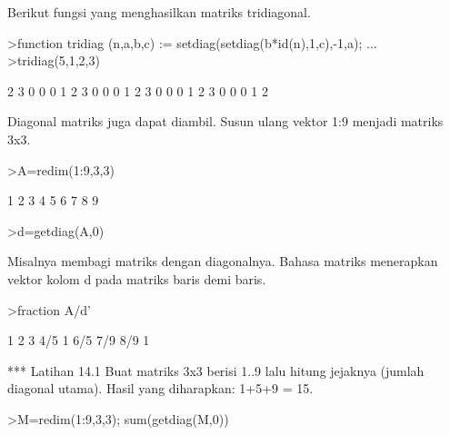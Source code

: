 \documentclass[a4paper,10pt]{article}
\begin{document}
\begin{eulernotebook}
\begin{eulercomment}
\begin{eulercomment}
\begin{eulercomment}
\begin{eulercomment}
\begin{eulercomment}
\begin{eulercomment}
\begin{eulercomment}
\begin{eulercomment}
\begin{eulercomment}
\begin{eulercomment}
\begin{eulercomment}
\begin{eulercomment}
\begin{eulercomment}
\begin{eulercomment}
\begin{eulercomment}
Berikut fungsi yang menghasilkan matriks tridiagonal.
\end{eulercomment}
\begin{eulerprompt}
>function tridiag (n,a,b,c) := setdiag(setdiag(b*id(n),1,c),-1,a); ...
>tridiag(5,1,2,3)
\end{eulerprompt}
\begin{euleroutput}
              2             3             0             0             0 
              1             2             3             0             0 
              0             1             2             3             0 
              0             0             1             2             3 
              0             0             0             1             2 
\end{euleroutput}
\begin{eulercomment}
Diagonal matriks juga dapat diambil. Susun ulang vektor 1:9 menjadi
matriks 3x3.
\end{eulercomment}
\begin{eulerprompt}
>A=redim(1:9,3,3)
\end{eulerprompt}
\begin{euleroutput}
              1             2             3 
              4             5             6 
              7             8             9 
\end{euleroutput}
\begin{eulerprompt}
>d=getdiag(A,0)
\end{eulerprompt}
\begin{euleroutput}
  [1,  5,  9]
\end{euleroutput}
\begin{eulercomment}
Misalnya membagi matriks dengan diagonalnya. Bahasa matriks menerapkan
vektor kolom d pada matriks baris demi baris.
\end{eulercomment}
\begin{eulerprompt}
>fraction A/d'
\end{eulerprompt}
\begin{euleroutput}
          1         2         3 
        4/5         1       6/5 
        7/9       8/9         1 
\end{euleroutput}
\begin{eulercomment}
*** Latihan 14.1
Buat matriks 3x3 berisi 1..9 lalu hitung jejaknya (jumlah diagonal utama).
Hasil yang diharapkan: 1+5+9 = 15.
\end{eulercomment}
\begin{eulerprompt}
>M=redim(1:9,3,3); sum(getdiag(M,0))
\end{eulerprompt}

\end{eulercomment}
\end{eulercomment}
\end{eulercomment}
\end{eulercomment}
\end{eulercomment}
\end{eulercomment}
\end{eulercomment}
\end{eulercomment}
\end{eulercomment}
\end{eulercomment}
\end{eulercomment}
\end{eulercomment}
\end{eulercomment}
\end{eulercomment}
\end{eulernotebook}
\end{document}
